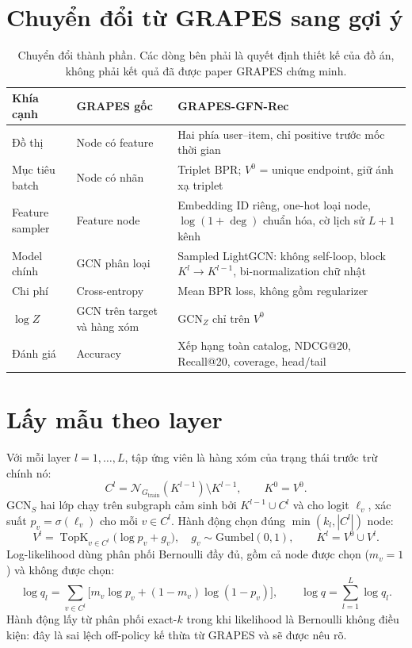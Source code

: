 \documentclass[11pt,a4paper,oneside]{report}
\begin{document}
\section{Chuyển đổi từ GRAPES sang gợi ý}
\begin{table}[h]
\centering\small
\caption{Chuyển đổi thành phần. Các dòng bên phải là quyết định thiết kế của đồ án, không phải kết quả đã được paper GRAPES chứng minh.}\label{tab:adapt}
\begin{tabularx}{\linewidth}{lYY}
\toprule
Khía cạnh & GRAPES gốc & GRAPES-GFN-Rec \\
\midrule
Đồ thị & Node có feature & Hai phía user--item, chỉ positive trước mốc thời gian \\
Mục tiêu batch & Node có nhãn & Triplet BPR; $V^0$ = unique endpoint, giữ ánh xạ triplet \\
Feature sampler & Feature node & Embedding ID riêng, one-hot loại node, $\log(1+\deg)$ chuẩn hóa, cờ lịch sử $L{+}1$ kênh \\
Model chính & GCN phân loại & Sampled LightGCN: không self-loop, block $K^l \rightarrow K^{l-1}$, bi-normalization chữ nhật \\
Chi phí & Cross-entropy & Mean BPR loss, không gồm regularizer \\
$\log Z$ & GCN trên target và hàng xóm & $\mathrm{GCN}_Z$ chỉ trên $V^0$ \\
Đánh giá & Accuracy & Xếp hạng toàn catalog, NDCG@20, Recall@20, coverage, head/tail \\
\bottomrule
\end{tabularx}
\end{table}

\section{Lấy mẫu theo layer}
Với mỗi layer $l = 1,\dots,L$, tập ứng viên là hàng xóm của trạng thái trước trừ chính nó:
\[
C^l = \mathcal{N}_{G_{\text{train}}}(K^{l-1}) \setminus K^{l-1}, \qquad K^0 = V^0.
\]
$\mathrm{GCN}_S$ hai lớp chạy trên subgraph cảm sinh bởi $K^{l-1}\cup C^l$ và cho logit $\ell_v$, xác suất $p_v = \sigma(\ell_v)$ cho mỗi $v\in C^l$. Hành động chọn đúng $\min(k_l,|C^l|)$ node:
\[
V^l = \operatorname{TopK}_{v\in C^l}\big(\log p_v + g_v\big),\quad g_v\sim\mathrm{Gumbel}(0,1), \qquad K^l = V^0 \cup V^l.
\]
Log-likelihood dùng phân phối Bernoulli đầy đủ, gồm cả node được chọn ($m_v=1$) và không được chọn:
\[
\log q_l = \sum_{v\in C^l} \big[m_v \log p_v + (1-m_v)\log(1-p_v)\big], \qquad \log q = \sum_{l=1}^{L} \log q_l.
\]
Hành động lấy từ phân phối exact-$k$ trong khi likelihood là Bernoulli không điều kiện: đây là sai lệch off-policy kế thừa từ GRAPES và sẽ được nêu rõ.
\end{document}
